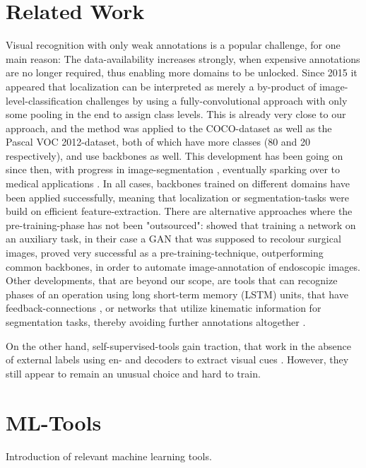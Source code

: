 \section{Related Work}
Visual recognition with only weak annotations is a popular challenge, for one main reason: The data-availability increases strongly, when expensive annotations are no longer required, thus enabling more domains to be unlocked. Since 2015 it appeared that localization can be interpreted as merely a by-product of image-level-classification challenges \citep{localization_free} by using a fully-convolutional approach with only some pooling in the end to assign class levels. This is already very close to our approach, and the method was applied to the COCO-dataset as well as the Pascal VOC 2012-dataset, both of which have more classes (80 and 20 respectively), and use backbones as well. This development has been going on since then, with progress in image-segmentation \citep{classpeak}, eventually sparking over to medical applications \citep{Vardazaryan}.
In all cases, backbones trained on different domains have been applied successfully, meaning that localization or segmentation-tasks were build on efficient feature-extraction. There are alternative approaches where the pre-training-phase has not been "outsourced": \cite{ross2018exploiting} showed that training a network on an auxiliary task, in their case a GAN that was supposed to recolour surgical images, proved very successful as a pre-training-technique, outperforming common backbones, in order to automate image-annotation of endoscopic images.
Other developments, that are beyond our scope, are tools that can recognize phases of an operation using long short-term memory (LSTM) units, that have feedback-connections \citep{lstm}, or networks that utilize kinematic information for segmentation tasks, thereby avoiding further annotations altogether \citep{da2019self}.

On the other hand, self-supervised-tools gain traction, that work in the absence of external labels using en- and decoders to extract visual cues \citep{VAE_discussion}. However, they still appear to remain an unusual choice and hard to train.

\section{ML-Tools}
Introduction of relevant machine learning tools.

